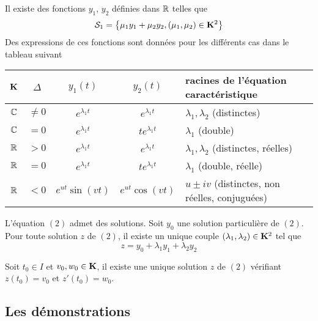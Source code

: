 \begin{prop}
 Il existe des fonctions $y_1$, $y_2$ définies dans $\mathbb{R}$ telles que
\begin{displaymath}
 \mathcal S_1 = \left\lbrace \mu_1 y_1 + \mu_2 y_2, (\mu_1,\mu_2)\in \mathbf{K}^2\right\rbrace 
\end{displaymath}
Des expressions de ces fonctions sont données pour les différents cas dans le tableau suivant 
\end{prop}
\begin{center}
\renewcommand{\arraystretch}{1.5}
\begin{tabular}{|c|c|c|c|l|} \hline
$\mathbf{K}$ & $\Delta$ & $y_1(t)$         & $y_2(t)$           &  racines de l'équation caractéristique              \\ \hline
$\mathbb{C}$ & $\neq 0$ & $e^{\lambda_1 t}$& $e^{\lambda_1 t}$  & $\lambda_1 , \lambda_2$ (distinctes)            \\ \hline
$\mathbb{C}$ & $=0$     & $e^{\lambda_1 t}$& $te^{\lambda_1 t}$ & $\lambda_1$ (double)                            \\ \hline
$\mathbb{R}$ & $>0$     & $e^{\lambda_1 t}$& $e^{\lambda_1 t}$  & $\lambda_1 , \lambda_2$ (distinctes, réelles)   \\ \hline
$\mathbb{R}$ & $=0$     & $e^{\lambda_1 t}$& $te^{\lambda_1 t}$ & $\lambda_1$ (double, réelle)                    \\ \hline
$\mathbb{R}$ & $<0$     & $e^{ut}\sin(vt)$ & $e^{ut}\cos(vt)$   & $u\pm iv$ (distinctes, non réelles, conjuguées) \\ \hline
\end{tabular}
\end{center}
\begin{prop}
 L'équation $(2)$ admet des solutions. Soit $y_0$ une solution particulière de $(2)$. Pour toute solution $z$ de $(2)$, il existe un unique couple $(\lambda_1,\lambda_2)\in \mathbf{K}^2$ tel que
\begin{displaymath}
 z = y_0 + \lambda_1 y_1 + \lambda_2 y_2
\end{displaymath}
\end{prop}
\begin{prop}
 Soit $t_0\in I$ et $v_0, w_0\in\mathbf{K}$, il existe une unique solution $z$ de $(2)$ vérifiant $z(t_0)=v_0$ et  $z'(t_0)=w_0$.
\end{prop}


\subsection{Les démonstrations}
